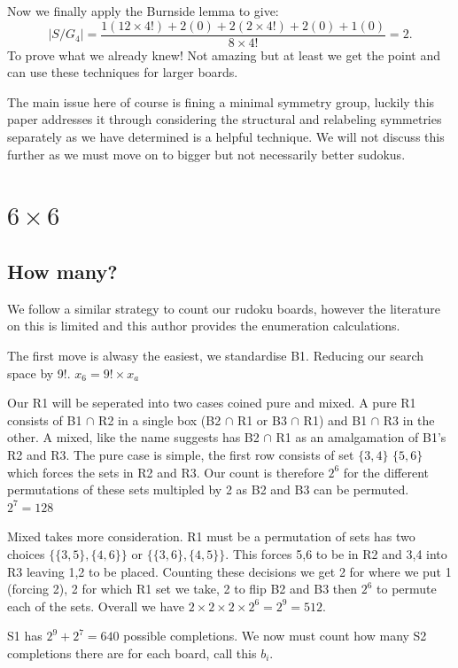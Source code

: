 \documentclass[a4paper,11pt]{report}
\newcounter{row}
\begin{document}
Now we finally apply the Burnside lemma to give:
\begin{equation}|S/G_4|=\frac{1(12\times 4!)+ 2(0)+2(2\times 4!)+2(0)+1(0)}{8\times 4!}=2.\end{equation}
To prove what we already knew! Not amazing but at least we get the point and can use these techniques for larger boards.

The main issue here of course is fining a minimal symmetry group, luckily this paper addresses it \cite{minimal complete shidoku symmetry groups} through considering the structural and relabeling symmetries separately as we have determined is a helpful technique. We will not discuss this further as we must move on to bigger but not necessarily better sudokus.

	\section{$6 \times 6$}
	
\subsection{How many?}

We follow a similar strategy to count our rudoku boards, however the literature on this is limited and this author provides the enumeration calculations. 

The first move is alwasy the easiest, we standardise B1. Reducing our search space by 9!.  $x_6=9!\times x_a$

Our R1 will be seperated into two cases coined pure and mixed. A pure R1 consists of B1 $\cap$ R2 in a single box (B2 $\cap$ R1 or B3 $\cap$ R1) and B1 $\cap$ R3 in the other. A mixed, like the name suggests has B2 $\cap$ R1 as an amalgamation of B1's R2 and R3. The pure case is simple, the first row consists of set $\{3,4\}$ $\{5,6\}$ which forces the sets in R2 and R3. Our count is therefore $2^6$ for the different permutations of these sets multipled by 2 as B2 and B3 can be permuted. $2^7=128$

Mixed takes more consideration. R1 must be a permutation of sets has two choices $\{\{3,5\},\{4,6\}\}$ or $\{\{3,6\},\{4,5\}\}$. This forces 5,6 to be in R2 and 3,4 into R3 leaving 1,2 to be placed. Counting these decisions we get 2 for where we put 1 (forcing 2), 2 for which R1 set we take, 2 to flip B2 and B3 then $2^6$ to permute each of the sets. Overall we have $2\times 2 \times 2 \times 2^6=2^9=512$. 

S1 has $2^9+2^7=640$ possible completions. We now must count how many S2 completions there are for each board, call this $b_i$.
\end{document}
